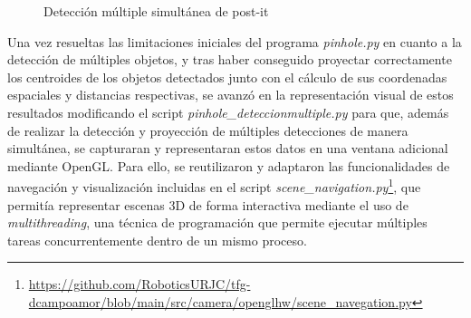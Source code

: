    \begin{figure}[H]
   \centering
   \begin{center}
     \subcapcentertrue
     \hspace{2mm}
   \end{center}
   \caption{Detección múltiple simultánea de post-it}
   \label{fig:deteccion_multiple_ptos}
  \end{figure}
  
Una vez resueltas las limitaciones iniciales del programa \textit{pinhole.py} en cuanto a la detección de múltiples objetos, y tras haber conseguido proyectar correctamente los centroides de los objetos detectados junto con el cálculo de sus coordenadas espaciales y distancias respectivas, se avanzó en la representación visual de estos resultados modificando el script \textit{pinhole\_deteccionmultiple.py} para que, además de realizar la detección y proyección de múltiples detecciones de manera simultánea, se capturaran y representaran estos datos en una ventana adicional mediante OpenGL. Para ello, se reutilizaron y adaptaron las funcionalidades de navegación y visualización incluidas en el script \textit{scene\_navigation.py}\footnote{\url{https://github.com/RoboticsURJC/tfg-dcampoamor/blob/main/src/camera/openglhw/scene_navegation.py}}, que permitía representar escenas 3D de forma interactiva mediante el uso de \textit{multithreading}, una técnica de programación que permite ejecutar múltiples tareas concurrentemente dentro de un mismo proceso.

